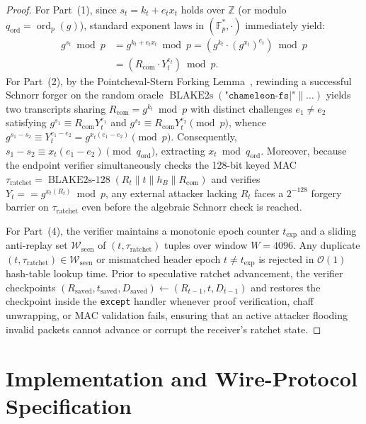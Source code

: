 \documentclass[conference,10pt]{IEEEtran}
\begin{document}
\begin{proof}
For Part~(1), since $s_t = k_t + e_t x_t$ holds over $\mathbb{Z}$ (or modulo $q_{\text{ord}} = \operatorname{ord}_p(g)$), standard exponent laws in $(\mathbb{F}_p^*, \cdot)$ immediately yield:
\begin{equation}
\begin{aligned}
g^{s_t} \bmod p &= g^{k_t + e_t x_t} \bmod p = \left(g^{k_t} \cdot (g^{x_t})^{e_t}\right) \bmod p \\
&= \left(R_{\text{com}} \cdot Y_t^{e_t}\right) \bmod p.
\end{aligned}
\end{equation}
For Part~(2), by the Pointcheval-Stern Forking Lemma~\cite{pointcheval2000security}, rewinding a successful Schnorr forger on the random oracle $\operatorname{BLAKE2s}(\texttt{"chameleon-fs|"} \parallel \dots)$ yields two transcripts sharing $R_{\text{com}} = g^{k_t} \bmod p$ with distinct challenges $e_1 \ne e_2$ satisfying $g^{s_1} \equiv R_{\text{com}} Y_t^{e_1}$ and $g^{s_2} \equiv R_{\text{com}} Y_t^{e_2} \pmod p$, whence $g^{s_1 - s_2} \equiv Y_t^{e_1 - e_2} = g^{x_t(e_1 - e_2)} \pmod p$. Consequently, $s_1 - s_2 \equiv x_t(e_1 - e_2) \pmod{q_{\text{ord}}}$, extracting $x_t \bmod q_{\text{ord}}$. Moreover, because the endpoint verifier simultaneously checks the 128-bit keyed MAC $\tau_{\text{ratchet}} = \operatorname{BLAKE2s-128}(R_t \parallel t \parallel h_B \parallel R_{\text{com}})$ and verifies $Y_t == g^{x_t(R_t)} \bmod p$, any external attacker lacking $R_t$ faces a $2^{-128}$ forgery barrier on $\tau_{\text{ratchet}}$ even before the algebraic Schnorr check is reached.

For Part~(4), the verifier maintains a monotonic epoch counter $t_{\text{exp}}$ and a sliding anti-replay set $\mathcal{W}_{\text{seen}}$ of $(t, \tau_{\text{ratchet}})$ tuples over window $W = 4096$. Any duplicate $(t, \tau_{\text{ratchet}}) \in \mathcal{W}_{\text{seen}}$ or mismatched header epoch $t \ne t_{\text{exp}}$ is rejected in $\mathcal{O}(1)$ hash-table lookup time. Prior to speculative ratchet advancement, the verifier checkpoints $(R_{\text{saved}}, t_{\text{saved}}, D_{\text{saved}}) \leftarrow (R_{t-1}, t, D_{t-1})$ and restores the checkpoint inside the \texttt{except} handler whenever proof verification, chaff unwrapping, or MAC validation fails, ensuring that an active attacker flooding invalid packets cannot advance or corrupt the receiver's ratchet state.
\end{proof}

\section{Implementation and Wire-Protocol Specification}
\label{sec:impl}
\end{document}
